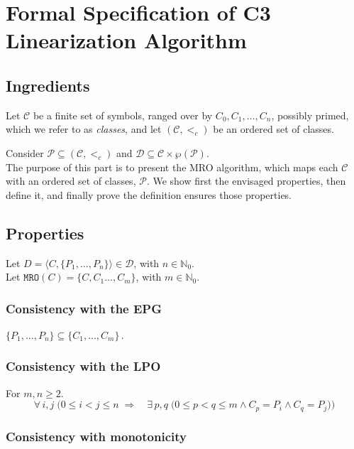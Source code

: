 \documentclass[runningheads]{llncs}
\newcommand*{\CC}{\ensuremath{\mathcal{C}}\xspace}
\newcommand*{\DD}{\ensuremath{\mathcal{D}}\xspace}
\newcommand*{\ordCC}{\ensuremath{(\mathcal{C}, <_c)}\xspace}
\newcommand*{\mro}{\texttt{MRO}}
\newcommand*{\natz}{\ensuremath{\mathbb{N}_0}}
\begin{document}
\section{Formal Specification of C3 Linearization Algorithm}
\label{sec:FormalSpecC3}


\subsection{Ingredients}

Let \CC be a finite set of symbols, ranged over by \( C_0, C_1, \ldots, C_n \), possibly primed, which we refer to as \emph{classes}, and let \ordCC be an ordered set of classes. %

Consider $\mathcal P \subseteq \ordCC$ and $\DD \subseteq \CC \times \wp{(\mathcal P)}$.\\

The purpose of this part is to present the MRO algorithm,
which maps each $\CC$ with an ordered set of classes, $\mathcal P$. We show first the envisaged properties, then define it, and finally prove the definition ensures those properties.

\subsection{Properties}
\label{subsec:PropertiesformalSpec}


Let $D = \langle C, \{P_1, \dots, P_n\} \rangle \in \DD$, with $n\in\natz$.\\
Let $\mro(C) = \{C,C_1 \dots, C_m\}$, with $m \in \natz$.\\
\subsubsection{Consistency with the EPG} 

\(
\{P_1, \dots, P_n\} \subseteq \{C_1, \dots, C_m\}\,.
\)


\subsubsection{Consistency with the LPO}
For $m,n \geq 2$.
\begin{equation*}
\forall\,i,j\;\bigl(0\le i<j\le n \;\Longrightarrow \quad \exists\,p,q\;\bigl(0\le p<q\le m \wedge C_p=P_i \wedge C_q=P_j\bigr)\bigr)
\end{equation*}
\subsubsection{Consistency with monotonicity}
\end{document}
